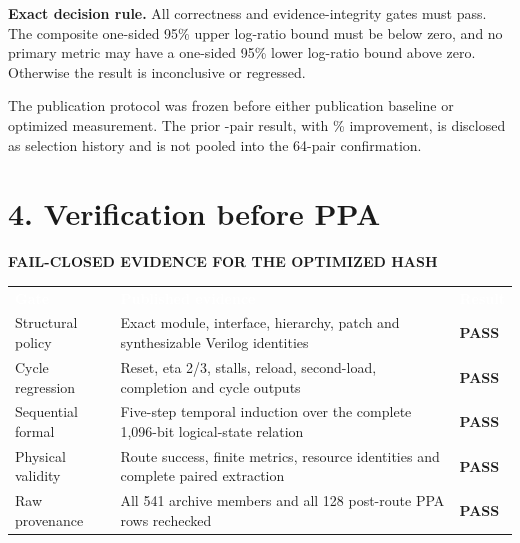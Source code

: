 \documentclass[10pt,a4paper]{article}
\newcommand{\hash}[1]{{\scriptsize\ttfamily\seqsplit{#1}}}
\newcommand{\smallcaps}[1]{\textcolor{Mid}{\fontsize{8.5}{10}\selectfont\bfseries\MakeUppercase{#1}}}
\newcommand{\newpageheading}[2]{\clearpage\section{#1}\smallcaps{#2}\vspace{6pt}}
\newcommand{\yes}{\textcolor{GotherBlue}{\textbf{PASS}}}
\newcommand{\thead}[1]{\textcolor{white}{\textbf{#1}}}
\begin{document}
\vspace{8mm}
\begin{center}
\end{center}

\begin{scopebox}
\textbf{Exact decision rule.} All correctness and evidence-integrity gates must pass. The composite one-sided 95\% upper log-ratio bound must be below zero, and no primary metric may have a one-sided 95\% lower log-ratio bound above zero. Otherwise the result is inconclusive or regressed.
\end{scopebox}

The publication protocol was frozen before either publication baseline or optimized measurement. The prior \InitialPairCount{}-pair result, with \InitialImprovement\% improvement, is disclosed as selection history and is not pooled into the 64-pair confirmation.

\newpageheading{4. Verification before PPA}{Fail-closed evidence for the optimized hash}

{\small
{}
\begin{tabularx}{\textwidth}{@{}P{40mm}Y P{19mm}@{}}
\thead{Gate} & \thead{Published evidence} & \thead{Result} \\
Structural policy & Exact module, interface, hierarchy, patch and synthesizable Verilog identities & \yes \\
Cycle regression & Reset, eta 2/3, stalls, reload, second-load, completion and cycle outputs & \yes \\
Sequential formal & Five-step temporal induction over the complete 1,096-bit logical-state relation & \yes \\
Physical validity & Route success, finite metrics, resource identities and complete paired extraction & \yes \\
Raw provenance & All 541 archive members and all 128 post-route PPA rows rechecked & \yes \\
\end{tabularx}
}
\end{document}
